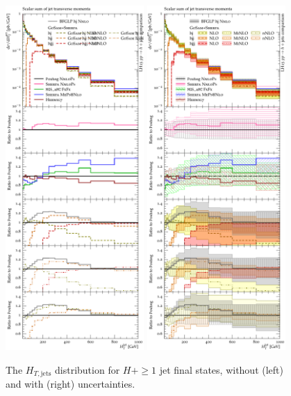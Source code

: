 \begin{figure}[t!]
  \centering
  \includegraphics[width=0.47\textwidth]{figures/hjetscomp_u_HT_jets.pdf}
  \hfill
  \includegraphics[width=0.47\textwidth]{figures/hjetscomp_HT_jets.pdf}
  \caption{
    The $H_{T,\mathrm{jets}}$ distribution for $H+\ge1$ jet final
    states, without (left) and with (right) uncertainties.
    \label{fig:higgscomp:results:mobs:HT_jets}
  }
\end{figure}

